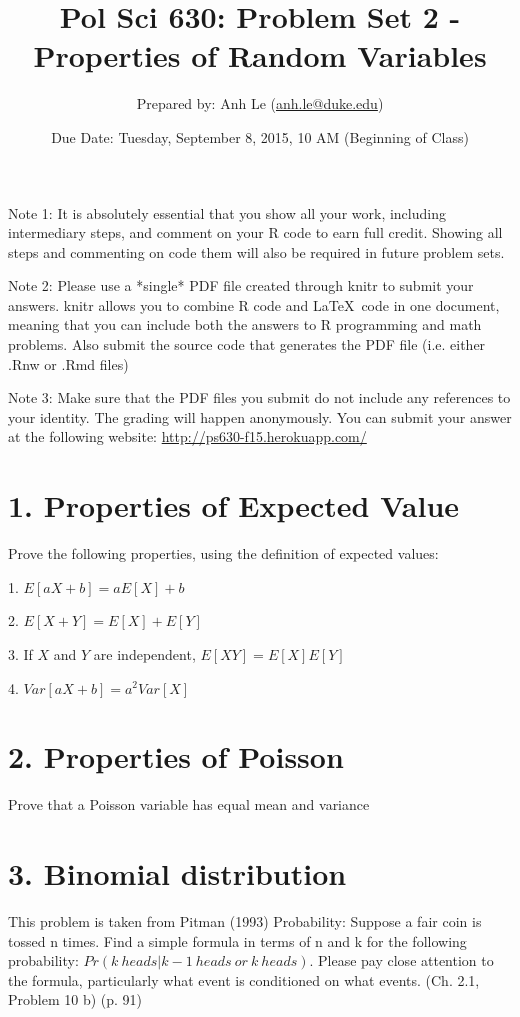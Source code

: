 \documentclass{article}\usepackage[]{graphicx}\usepackage[]{color}
\title{Pol Sci 630: Problem Set 2 - Properties of Random Variables}
\author{Prepared by: Anh Le (\href{mailto:anh.le@duke.edu}{anh.le@duke.edu})}
\date{Due Date: Tuesday, September 8, 2015, 10 AM (Beginning of Class)}
\begin{document}
\maketitle

Note 1: It is absolutely essential that you show all your work, including intermediary steps, and comment on your R code to earn full credit. Showing all steps and commenting on code them will also be required in future problem sets.

Note 2: Please use a *single* PDF file created through knitr to submit your answers. knitr allows you to combine R code and \LaTeX \ code in one document, meaning that you can include both the answers to R programming and math problems. Also submit the source code that generates the PDF file (i.e. either .Rnw or .Rmd files)

Note 3: Make sure that the PDF files you submit do not include any references to your identity. The grading will happen anonymously. You can submit your answer at the following website: \url{http://ps630-f15.herokuapp.com/}

\section*{1. Properties of Expected Value}

Prove the following properties, using the definition of expected values:

1. $E[aX + b] = aE[X] + b$

2. $E[X + Y] = E[X] + E[Y]$

3. If $X$ and $Y$ are independent, $E[XY] = E[X]E[Y]$

4. $Var[aX + b] = a^2 Var[X]$

\section*{2. Properties of Poisson}

Prove that a Poisson variable has equal mean and variance

\section*{3. Binomial distribution}

This problem is taken from Pitman (1993) Probability: Suppose a fair coin is tossed n times. Find a simple formula in terms of n and k for the following probability: $Pr(k\ heads | k-1\ heads\ or\ k\ heads)$. Please pay close attention to the formula, particularly what event is conditioned on what events. (Ch. 2.1, Problem 10 b) (p. 91)
\end{document}
